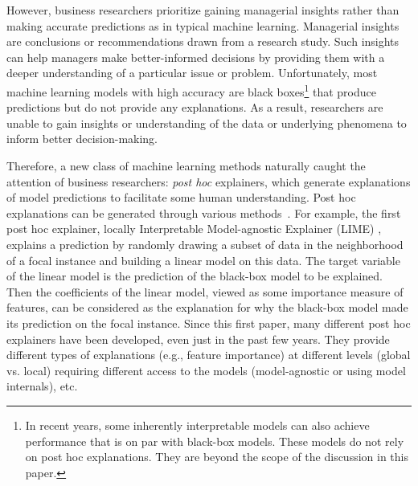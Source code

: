 \documentclass[11pt]{article}    %
\begin{document}
However, business researchers prioritize gaining managerial insights rather than making accurate predictions as in typical machine learning. Managerial insights are conclusions or recommendations drawn from a research study. Such insights can help managers make better-informed decisions by providing them with a deeper understanding of a particular issue or problem. 
Unfortunately, most machine learning models with high accuracy are black boxes\footnote{In recent years, some inherently interpretable models can also achieve performance that is on par with black-box models. These models do not rely on post hoc explanations. They are beyond the scope of the discussion in this paper.} that produce predictions but do not provide any explanations. As a result, researchers are unable to gain insights or understanding of the data or underlying phenomena to inform better decision-making.


Therefore, a new class of machine learning methods  naturally caught the attention of business researchers: \emph{post hoc} explainers, which generate explanations of model predictions to facilitate some human understanding. Post hoc explanations can be generated through various methods~\citep{ribeiro16lime,lundberg17shap,friedman01greedy,wachter17wachtercf}.
For example, the first post hoc explainer, locally Interpretable Model-agnostic Explainer (LIME) \citep{ribeiro16lime}, explains a prediction by randomly drawing a subset of data in the neighborhood of a focal instance and building a linear model on this data. The target variable of the linear model is the prediction of the black-box model to be explained. Then the coefficients of the linear model, viewed as some importance measure of features, can be considered as the explanation for why the black-box model made its prediction on the focal instance.  Since this first paper, many different post hoc explainers have been developed, even just in the past few years. They provide different types of explanations (e.g., feature importance) at different levels (global vs. local) requiring different access to the models (model-agnostic or using model internals), etc. 
\end{document}
